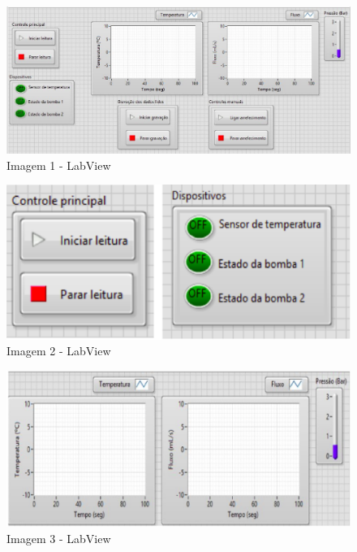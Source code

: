 \begin{figure}[!htb]                                                               
    \centering                                                                      
    \includegraphics[scale=0.6, keepaspectratio=true]{figuras/labview_1.eps} 
    \caption{Imagem 1 - LabView}
 \end{figure}
 \newpage\begin{figure}[!htb]                                                               
    \centering                                                                      
    \includegraphics[scale=0.6, keepaspectratio=true]{figuras/labview_2.eps} 
    \caption{Imagem 2 - LabView}
 \end{figure}
 \begin{figure}[!htb]                                                               
    \centering                                                                      
    \includegraphics[scale=0.6, keepaspectratio=true]{figuras/labview_3.eps} 
    \caption{Imagem 3 - LabView}
 \end{figure}
 

